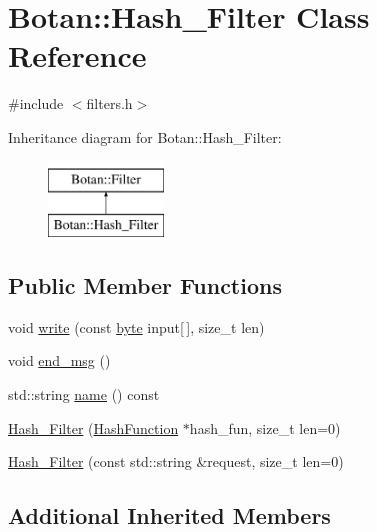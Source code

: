 \hypertarget{classBotan_1_1Hash__Filter}{\section{Botan\-:\-:Hash\-\_\-\-Filter Class Reference}
\label{classBotan_1_1Hash__Filter}
}


{\ttfamily \#include $<$filters.\-h$>$}

Inheritance diagram for Botan\-:\-:Hash\-\_\-\-Filter\-:\begin{figure}[H]
\begin{center}
\leavevmode
\includegraphics[height=2.000000cm]{classBotan_1_1Hash__Filter}
\end{center}
\end{figure}
\subsection*{Public Member Functions}
\begin{DoxyCompactItemize}
\item 
void \hyperlink{classBotan_1_1Hash__Filter_a601f395b680e3bdb04977da8b6cd9d6a}{write} (const \hyperlink{namespaceBotan_a7d793989d801281df48c6b19616b8b84}{byte} input\mbox{[}$\,$\mbox{]}, size\-\_\-t len)
\item 
void \hyperlink{classBotan_1_1Hash__Filter_a83140a5d46d7826b448b4f9e05fb8a5f}{end\-\_\-msg} ()
\item 
std\-::string \hyperlink{classBotan_1_1Hash__Filter_a22e47b9b2857439231a21079b0735288}{name} () const 
\item 
\hyperlink{classBotan_1_1Hash__Filter_a863b7d94f99235b018bc05c16822b69c}{Hash\-\_\-\-Filter} (\hyperlink{classBotan_1_1HashFunction}{Hash\-Function} $\ast$hash\-\_\-fun, size\-\_\-t len=0)
\item 
\hyperlink{classBotan_1_1Hash__Filter_a748c7ed5f126ec67e8a24a6956d0e233}{Hash\-\_\-\-Filter} (const std\-::string \&request, size\-\_\-t len=0)
\end{DoxyCompactItemize}
\subsection*{Additional Inherited Members}


